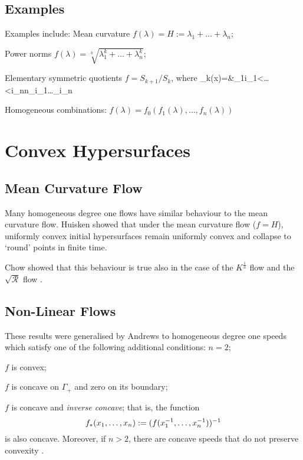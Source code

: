 \documentclass[12pt,ignorenonframes]{beamer}
\theoremstyle{plain}
\numberwithin{equation}{section}
\theoremstyle{remark}
\def\bann #1\eann {\begin{align*} #1\end{align*}}
\def\ben #1\een {\begin{enumerate} #1\end{enumerate}}
\def\bi #1\ei {\begin{itemize} #1\end{itemize}}
\def\bf #1\ef {\begin{frame}<presentation> #1\end{frame}}
\begin{document}
\subsection{Examples}
\bf{Examples}
Examples include:
\ben
\item Mean curvature $f(\lambda)=H:=\lambda_1+\dots+\lambda_n$; 
\item Power norms $f(\lambda)=\sqrt[k]{\lambda_1^k+\dots+\lambda_n^k}$; 
\item Elementary symmetric quotients $f=S_{k+1}/S_k$, where
\bann 
S_k(x)={}&\sum_{1\leq i_1<\dots <i_n\leq n}\lambda_{i_{1}}\dots\lambda_{i_{n}}
\eann 
\item Homogeneous combinations: $f(\lambda)= f_0(f_1(\lambda),\dots,f_n(\lambda))$
\een
\ef

\section{Convex Hypersurfaces}

\subsection{Mean Curvature Flow}
\bf{Convex Hypersurfaces (Mean Curvature Flow)}
Many homogeneous degree one flows have similar behaviour to the mean curvature flow.
\bi
\item Huisken \cite{Hu84} showed that under the mean curvature flow ($f=H$), uniformly convex initial hypersurfaces remain uniformly convex and collapse to `round' points in finite time. 
\item Chow showed that this behaviour is true also in the case of the $K^{\frac{1}{n}}$ flow \cite{Ch1} and the $\sqrt{\mathcal{R}}$ flow \cite{Ch2}.
\ei
\ef

\subsection{Non-Linear Flows}
\bf{Convex Hypersurfaces (Non-Linear Flows)}
These results were generalised by Andrews \cite{An94,An07} to homogeneous degree one speeds which satisfy one of the following additional conditions: 
\ben
\item $n=2$; 
\item $f$ is convex; 
\item $f$ is concave on $\Gamma_+$ and zero on its boundary; 
\item $f$ is concave and \textit{inverse concave}; 
\bi
\item that is, the function \vspace{-3mm}
$$
f_\ast(x_1,\dots, x_n):=(f(x_1^{-1},\dots,x_n^{-1}))^{-1}\vspace{-3mm}
$$
is also concave.
\ei
\een
Moreover, if $n>2$, there are concave speeds that do not preserve convexity \cite{AnMcZh}.
\ef
\end{document}
